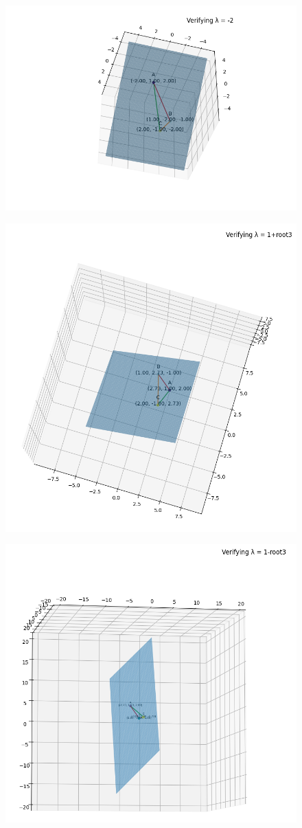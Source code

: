 \documentclass[journal]{IEEEtran}
\begin{document}
    \begin{figure}[h]
        \centering
       \includegraphics[width=0.7\linewidth]{figs/fig1.png}
       \caption{}
       \label{graph}
    \end{figure}
    \begin{figure}[h]
        \centering
       \includegraphics[width=0.7\linewidth]{figs/fig2.png}
       \caption{}
       \label{graph}
    \end{figure}
    \begin{figure}[h]
        \centering
       \includegraphics[width=0.7\linewidth]{figs/fig3.png}
       \caption{}
       \label{graph}
    \end{figure}    
\end{document}
